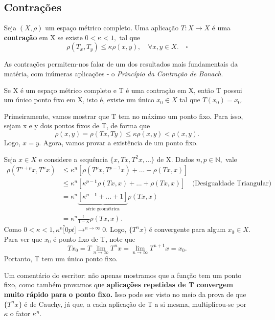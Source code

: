 \documentclass[MetricSpaces/metric_notes.tex]{subfiles}
\begin{document}
\subsection{Contrações}
\begin{def*}
	Seja \((X, \rho )\) um espaço métrico completo. Uma aplicação \(T:X\rightarrow X\) é uma \textbf{contração} em X se existe \(0 < \kappa < 1,\) tal que
	\[
		\rho (T_{x}, T_{y})\leq \kappa \rho (x, y),\quad \forall x, y\in X.\quad\square
	\]
\end{def*}
As contrações permitem-nos falar de um dos resultados mais fundamentais da matéria, com inúmeras aplicações - o \textit{Princípio da Contração de Banach}.
\hypertarget{banach_contraction}{\begin{theorem*}
		Se X é um espaço métrico completo e T é uma contração em X, então T possui um único ponto fixo em X, isto é, existe um único \(x_{0}\in X\) tal que \(T(x_{0}) = x_{0}.\)
	\end{theorem*}}
\begin{proof*}
	Primeiramente, vamos mostrar que T tem no máximo um ponto fixo. Para isso, sejam x e y dois pontos fixos de T, de forma que
	\[
		\rho (x, y) = \rho (Tx, Ty)\leq \kappa \rho (x, y) < \rho (x, y).
	\]
	Logo, \(x=y.\) Agora, vamos provar a existência de um ponto fixo.

	Seja \(x\in X\) e considere a sequência \(\{x, Tx, T^{2}x, \dotsc\}\) de X. Dados \(n, p\in \mathbb{N},\) vale
	\begin{align*}
		\rho (T^{n+p}x, T^{n}x) & \leq \kappa^{n}[\rho (T^{p}x, T^{p-1}x) + \dotsc + \rho (Tx, x)]                                       \\
		                        & \leq \kappa^{n}[\kappa^{p-1}\rho (Tx, x) + \dotsc + \rho(Tx, x)]\quad \text{(Desigualdade Triangular)} \\
		                        & = \kappa ^{n}\underbrace{[\kappa^{p-1} + \dotsc + 1]}_{\text{série geométrica}}\rho(Tx, x)             \\
		                        & = \kappa ^{n}\frac{1}{1-\kappa }\rho (Tx, x).
	\end{align*}
	Como \(0 < \kappa < 1, \kappa ^{n}\overbracket[0pt]{\longrightarrow}^{n\to \infty}0.\) Logo, \(\{T^{n}x\}\) é convergente para algum \(x_{0}\in X.\)
	Para ver que \(x_{0}\) é ponto fixo de T, note que
	\[
		Tx_{0} = T \lim_{n\to \infty}T^{n}x = \lim_{n\to \infty}T^{n+1}x = x_{0}.
	\]
	Portanto, T tem um único ponto fixo. \qedsymbol
\end{proof*}
Um comentário do escritor: não apenas mostramos que a função tem um ponto fixo, como também provamos que \textbf{aplicações repetidas de T convergem muito rápido para o ponto fixo.}
Isso pode ser visto no meio da prova de que \(\{T^{n}x\}\) é de Cauchy, já que, a cada aplicação de T a si mesma, multiplicou-se por \(\kappa \) o fator \(\kappa^{n}.\)
\end{document}
